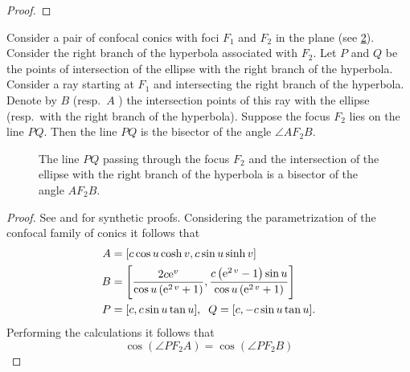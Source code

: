 \begin{figure} 
	\begin{center}
		\def\svgwidth{0.55\textwidth}
		
		\caption {   }
	\end{center}
	\label{fig:elipse_circulo}
\end{figure}
\begin{proof}


\end{proof}


\begin{theorem}
Consider a pair of confocal conics with foci $F_1$ and $F_2$ in the plane (see   \cref{fig:galperin}).
  Consider  the right branch of the hyperbola associated with $F_2$. Let $P$
and $Q$ be the points of intersection of the ellipse with the right branch of the hyperbola.
Consider a ray starting at $F_1$ and intersecting the right branch of the hyperbola. Denote
by $B$ (resp.\ $A$ ) the intersection points of this ray with the ellipse (resp.\  with the right branch of the
hyperbola). Suppose the focus $F_2$ lies on the line $P Q$. Then the line $P Q$ is the bisector of the
angle $  \angle  AF_2B$.  
\end{theorem}
\begin{figure}[H]
	\begin{center}
		\def\svgwidth{0.75\textwidth}
 	
		\caption { The line $PQ$ passing through the focus $F_2$ and the intersection of the ellipse with the right branch of the hyperbola  is a bisector of the angle $AF_2B$.}
		 \label{fig:galperin}
	\end{center}
\end{figure}
\begin{proof}
See \cite{galperin2011} and \cite{dolgirev2014} for synthetic proofs.
Considering the parametrization of the confocal family  of conics it follows that
\begin{align*}
    A&=[c\cos u\cosh v,c \sin u \sinh v]\\
    B&=\left[ {\frac {2c{{\rm e}^{v}}}{\cos u \left( {
{\rm e}^{2\,v}}+1 \right) }},{\frac { c \left( {{\rm e}^{2\,v}}-1
 \right) \sin u  }{\cos u
 \left( {{\rm e}^{2\,v}}+1 \right) }}\right]\\
    P&=[c,c\sin u\tan u],\;\;Q=[c,-c\sin u\tan u].  
\end{align*}
Performing the calculations it follows that
\[\cos(\angle PF_2A)=\cos(\angle PF_2B)\]
\end{proof}

